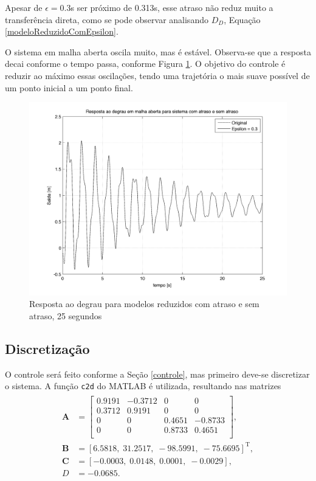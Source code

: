 Apesar de $\epsilon=0.3$s ser próximo de 0.313s, esse atraso não reduz muito a transferência direta, como se pode observar analisando $D_D$, Equação \ref{modeloReduzidoComEpsilon}.



 O sistema em malha aberta oscila muito, mas é estável. Observa-se que a resposta decai conforme o tempo passa, conforme Figura \ref{modeloMalhaAberta25s}. O objetivo do controle é reduzir ao máximo essas oscilações, tendo uma trajetória o mais suave possível de um ponto inicial a um ponto final. 
\begin{figure}[!ht]
\centering
\caption{Resposta ao degrau para modelos reduzidos com atraso e sem atraso, 25 segundos\label{modeloMalhaAberta25s}}
\includegraphics[width=0.8\linewidth]{figs/resultados/modelo/respostaMalhaAberta25s}
\end{figure}

\subsection{Discretização}
 O controle será feito conforme a Seção \ref{controle}, mas primeiro deve-se discretizar o sistema. A função \texttt{c2d} \cite{c2d} do MATLAB é utilizada, resultando nas matrizes \begin{align}
 \begin{array}{ll}
 	\mathbf{A} &= \left[\begin{array}{cccc}
	0.9191&   -0.3712&         0&         0\\
    0.3712&    0.9191&         0&         0\\
         0&         0&    0.4651&   -0.8733\\
         0&         0&    0.8733&    0.4651\\
 \end{array}\right],\\
 	\mathbf{B} &= \left[6.5818,\;
   31.2517,\;
  -98.5991,\;
  -75.6695\right]^{\mathrm{T}},\\
   \mathbf{C} &= \left[-0.0003,\;0.0148,\;0.0001,\;-0.0029\right],\\
   D &= -0.0685.
 \end{array}
 \end{align}
 
